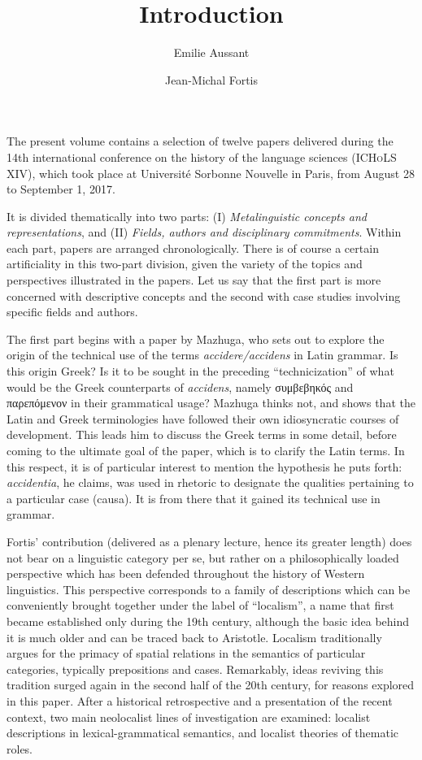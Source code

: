 \documentclass[output=paper]{langsci/langscibook}
\title{Introduction}
\author{Emilie Aussant\affiliation{Histoire des Théories Linguistiques (CNRS/Université de Paris)}\and Jean-Michal Fortis\affiliation{Histoire des Théories Linguistiques (CNRS/Université de Paris)}}
\begin{document}
\maketitle

\noindent The present volume contains a selection of twelve papers delivered during the 14th international conference on the history of the language sciences (\textsc{ICHoLS XIV}), which took place at Université Sorbonne Nouvelle in Paris, from August 28 to September 1, 2017.

It is divided thematically into two parts: (I) \emph{Metalinguistic concepts and representations}, and (II) \emph{Fields, authors and disciplinary commitments}. Within each part, papers are arranged chronologically. There is of course a certain artificiality in this two-part division, given the variety of the topics and perspectives illustrated in the papers. Let us say that the first part is more concerned with descriptive concepts and the second with case studies involving specific fields and authors.

The first part begins with a paper by Mazhuga, who sets out to explore the origin of the technical use of the terms \emph{accidere\slash accidens} in Latin grammar. Is this origin Greek? Is it to be sought in the preceding ``technicization'' of what would be the Greek counterparts of \emph{accidens}, namely συμβεβηκός and παρεπόμενον in their grammatical usage? Mazhuga thinks not, and shows that the Latin and Greek terminologies have followed their own idiosyncratic courses of development. This leads him to discuss the Greek terms in some detail, before coming to the ultimate goal of the paper, which is to clarify the Latin terms. In this respect, it is of particular interest to mention the hypothesis he puts forth: \emph{accidentia}, he claims, was used in rhetoric to designate the qualities pertaining to a particular case (causa). It is from there that it gained its technical use in grammar.

Fortis' contribution (delivered as a plenary lecture, hence its greater length) does not bear on a linguistic category per se, but rather on a philosophically loaded perspective which has been defended throughout the history of Western linguistics. This perspective corresponds to a family of descriptions which can be conveniently brought together under the label of ``localism'', a name that first became established only during the 19th century, although the basic idea behind it is much older and can be traced back to Aristotle. Localism traditionally argues for the primacy of spatial relations in the semantics of particular categories, typically prepositions and cases. Remarkably, ideas reviving this tradition surged again in the second half of the 20th century, for reasons explored in this paper. After a historical retrospective and a presentation of the recent context, two main neolocalist lines of investigation are examined: localist descriptions in lexical-grammatical semantics, and localist theories of thematic roles.
\end{document}

